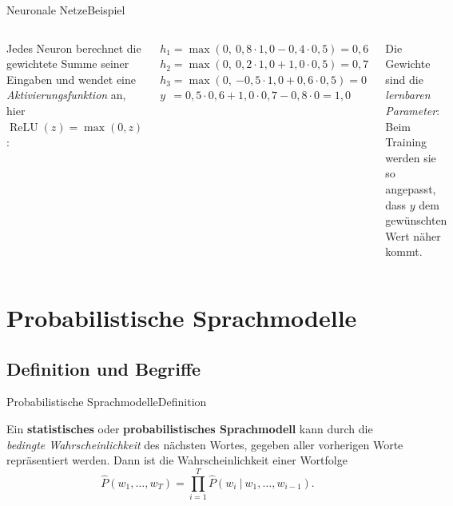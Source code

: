 \documentclass[aspectratio=169,10pt]{beamer}
\begin{document}
\begin{frame}{Neuronale Netze}{Beispiel}
\begin{columns}[onlytextwidth,c]

        \small
        Jedes Neuron berechnet die gewichtete Summe seiner Eingaben und wendet eine \emph{Aktivierungsfunktion} an, hier $\operatorname{ReLU}(z) = \max(0, z)$:

        \medskip
        \footnotesize
        $h_1 = \max(0,\ 0{,}8 \cdot 1{,}0 - 0{,}4 \cdot 0{,}5) = 0{,}6$\\[2pt]
        $h_2 = \max(0,\ 0{,}2 \cdot 1{,}0 + 1{,}0 \cdot 0{,}5) = 0{,}7$\\[2pt]
        $h_3 = \max(0,\ {-0{,}5} \cdot 1{,}0 + 0{,}6 \cdot 0{,}5) = 0$\\[6pt]
        $y\ \ = 0{,}5 \cdot 0{,}6 + 1{,}0 \cdot 0{,}7 - 0{,}8 \cdot 0 = 1{,}0$

        \medskip
        \small
        Die Gewichte sind die \emph{lernbaren Parameter}: Beim Training werden sie so angepasst, dass $y$ dem gewünschten Wert näher kommt.
    \end{columns}
\end{frame}

\section{Probabilistische Sprachmodelle}

\subsection{Definition und Begriffe}

\begin{frame}{Probabilistische Sprachmodelle}{Definition}
    \begin{definition}
        Ein \textbf{statistisches} oder \textbf{probabilistisches Sprachmodell} kann durch die \emph{bedingte Wahrscheinlichkeit} des nächsten Wortes, gegeben aller vorherigen Worte repräsentiert werden. Dann ist die Wahrscheinlichkeit einer Wortfolge
        \begin{equation*}
            \hat{P}(w_1, \dots, w_T)=\prod_{i=1}^{T}\hat{P}(w_i~\vert~w_1,\dots,w_{i-1}).
        \end{equation*}
    \end{definition}
\end{frame}
\end{document}
